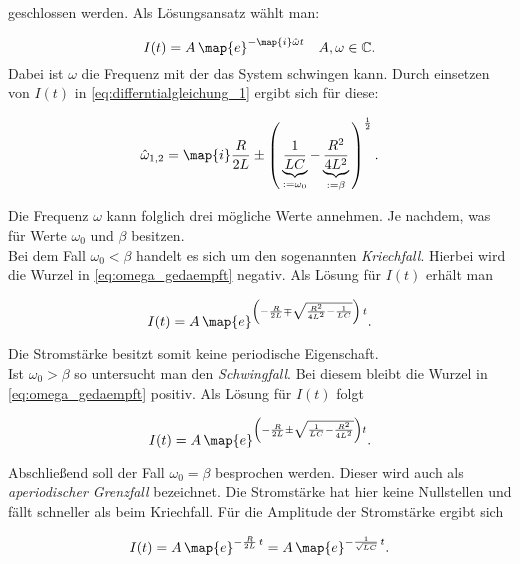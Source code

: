 geschlossen werden.
Als Lösungsansatz wählt man:

\begin{equation*}
  I(t)=A\,\map{e}^{-\map{i}\hat{\omega} t} \quad A,\omega\in\mathbb{C}.
\end{equation*}
Dabei ist $\omega$ die Frequenz mit der das System schwingen kann.
Durch einsetzen von $I(t)$ in \eqref{eq:differntialgleichung_1} ergibt sich
für diese:

\begin{equation}
  \label{eq:omega_gedaempft}
  \hat{\omega}_{1,2}=\map{i}\frac{R}{2L}\pm\left(\,\underbrace{\frac{1}{LC}}_{:=\omega_0}-\underbrace{\frac{R^2}{4L^2}}_{:=\beta}\,\right)^{\frac{1}{2}}.
\end{equation}

 Die Frequenz $\omega$ kann folglich drei mögliche Werte annehmen.
 Je nachdem, was für Werte $\omega_0$ und $\beta$ besitzen.
\\

Bei dem Fall $\omega_0<\beta$ handelt es sich um den sogenannten \emph{Kriechfall}.
 Hierbei wird die Wurzel in \eqref{eq:omega_gedaempft} negativ. Als Lösung für
 $I(t)$ erhält man

\begin{equation*}
     I(t)=A\,\map{e}^{\left(-\frac{R}{2L}\mp\sqrt{\frac{R^2}{4L^2}-\frac{1}{LC}}\right)\,t}.
\end{equation*}

Die Stromstärke besitzt somit keine periodische Eigenschaft.
\\

Ist $\omega_0>\beta$ so untersucht man den \emph{Schwingfall}.
Bei diesem bleibt die Wurzel in \eqref{eq:omega_gedaempft} positiv. Als
Lösung für $I(t)$ folgt

\begin{equation*}
  I(t)=A\,\map{e}^{\left(-\frac{R}{2L}\pm\sqrt{{\frac{1}{LC}}-\frac{R^2}{4L^2}}\right)t}.
\end{equation*}

Abschließend soll der Fall $\omega_0=\beta$ besprochen werden.
Dieser wird auch als \emph{aperiodischer Grenzfall} bezeichnet.
Die Stromstärke hat hier keine Nullstellen und fällt schneller als
beim Kriechfall.
Für die Amplitude der Stromstärke ergibt sich

\begin{equation}
  \label{eq:ap_grenz}
  I(t)=A\,\map{e}^{-\frac{R}{2L}\,t}=A\,\map{e}^{-\frac{1}{\sqrt{LC}}\,t}.
\end{equation}

